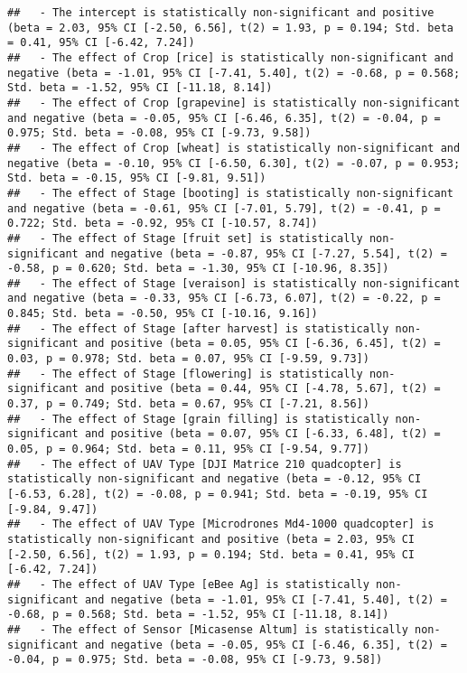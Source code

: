 \documentclass[
]{article}
\begin{document}
\begin{verbatim}
##   - The intercept is statistically non-significant and positive (beta = 2.03, 95% CI [-2.50, 6.56], t(2) = 1.93, p = 0.194; Std. beta = 0.41, 95% CI [-6.42, 7.24])
##   - The effect of Crop [rice] is statistically non-significant and negative (beta = -1.01, 95% CI [-7.41, 5.40], t(2) = -0.68, p = 0.568; Std. beta = -1.52, 95% CI [-11.18, 8.14])
##   - The effect of Crop [grapevine] is statistically non-significant and negative (beta = -0.05, 95% CI [-6.46, 6.35], t(2) = -0.04, p = 0.975; Std. beta = -0.08, 95% CI [-9.73, 9.58])
##   - The effect of Crop [wheat] is statistically non-significant and negative (beta = -0.10, 95% CI [-6.50, 6.30], t(2) = -0.07, p = 0.953; Std. beta = -0.15, 95% CI [-9.81, 9.51])
##   - The effect of Stage [booting] is statistically non-significant and negative (beta = -0.61, 95% CI [-7.01, 5.79], t(2) = -0.41, p = 0.722; Std. beta = -0.92, 95% CI [-10.57, 8.74])
##   - The effect of Stage [fruit set] is statistically non-significant and negative (beta = -0.87, 95% CI [-7.27, 5.54], t(2) = -0.58, p = 0.620; Std. beta = -1.30, 95% CI [-10.96, 8.35])
##   - The effect of Stage [veraison] is statistically non-significant and negative (beta = -0.33, 95% CI [-6.73, 6.07], t(2) = -0.22, p = 0.845; Std. beta = -0.50, 95% CI [-10.16, 9.16])
##   - The effect of Stage [after harvest] is statistically non-significant and positive (beta = 0.05, 95% CI [-6.36, 6.45], t(2) = 0.03, p = 0.978; Std. beta = 0.07, 95% CI [-9.59, 9.73])
##   - The effect of Stage [flowering] is statistically non-significant and positive (beta = 0.44, 95% CI [-4.78, 5.67], t(2) = 0.37, p = 0.749; Std. beta = 0.67, 95% CI [-7.21, 8.56])
##   - The effect of Stage [grain filling] is statistically non-significant and positive (beta = 0.07, 95% CI [-6.33, 6.48], t(2) = 0.05, p = 0.964; Std. beta = 0.11, 95% CI [-9.54, 9.77])
##   - The effect of UAV Type [DJI Matrice 210 quadcopter] is statistically non-significant and negative (beta = -0.12, 95% CI [-6.53, 6.28], t(2) = -0.08, p = 0.941; Std. beta = -0.19, 95% CI [-9.84, 9.47])
##   - The effect of UAV Type [Microdrones Md4-1000 quadcopter] is statistically non-significant and positive (beta = 2.03, 95% CI [-2.50, 6.56], t(2) = 1.93, p = 0.194; Std. beta = 0.41, 95% CI [-6.42, 7.24])
##   - The effect of UAV Type [eBee Ag] is statistically non-significant and negative (beta = -1.01, 95% CI [-7.41, 5.40], t(2) = -0.68, p = 0.568; Std. beta = -1.52, 95% CI [-11.18, 8.14])
##   - The effect of Sensor [Micasense Altum] is statistically non-significant and negative (beta = -0.05, 95% CI [-6.46, 6.35], t(2) = -0.04, p = 0.975; Std. beta = -0.08, 95% CI [-9.73, 9.58])

\end{verbatim}
\end{document}
